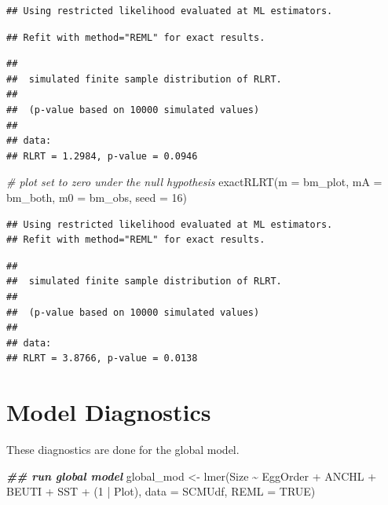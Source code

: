 \documentclass[
]{article}
\newenvironment{Shaded}{\begin{snugshade}}{\end{snugshade}}
\newcommand{\AttributeTok}[1]{\textcolor[rgb]{0.77,0.63,0.00}{#1}}
\newcommand{\CommentTok}[1]{\textcolor[rgb]{0.56,0.35,0.01}{\textit{#1}}}
\newcommand{\ConstantTok}[1]{\textcolor[rgb]{0.00,0.00,0.00}{#1}}
\newcommand{\DecValTok}[1]{\textcolor[rgb]{0.00,0.00,0.81}{#1}}
\newcommand{\DocumentationTok}[1]{\textcolor[rgb]{0.56,0.35,0.01}{\textbf{\textit{#1}}}}
\newcommand{\FunctionTok}[1]{\textcolor[rgb]{0.00,0.00,0.00}{#1}}
\newcommand{\NormalTok}[1]{#1}
\newcommand{\OtherTok}[1]{\textcolor[rgb]{0.56,0.35,0.01}{#1}}
\newcommand{\SpecialCharTok}[1]{\textcolor[rgb]{0.00,0.00,0.00}{#1}}
\begin{document}
\begin{verbatim}
## Using restricted likelihood evaluated at ML estimators.
\end{verbatim}

\begin{verbatim}
## Refit with method="REML" for exact results.
\end{verbatim}

\begin{verbatim}
## 
##  simulated finite sample distribution of RLRT.
##  
##  (p-value based on 10000 simulated values)
## 
## data:  
## RLRT = 1.2984, p-value = 0.0946
\end{verbatim}

\begin{Shaded}
\begin{Highlighting}[]
\CommentTok{\# plot set to zero under the null hypothesis }
\FunctionTok{exactRLRT}\NormalTok{(}\AttributeTok{m =}\NormalTok{ bm\_plot, }\AttributeTok{mA =}\NormalTok{ bm\_both, }\AttributeTok{m0 =}\NormalTok{ bm\_obs, }\AttributeTok{seed =} \DecValTok{16}\NormalTok{)}
\end{Highlighting}
\end{Shaded}

\begin{verbatim}
## Using restricted likelihood evaluated at ML estimators.
## Refit with method="REML" for exact results.
\end{verbatim}

\begin{verbatim}
## 
##  simulated finite sample distribution of RLRT.
##  
##  (p-value based on 10000 simulated values)
## 
## data:  
## RLRT = 3.8766, p-value = 0.0138
\end{verbatim}

\hypertarget{model-diagnostics}{%
\section{Model Diagnostics}\label{model-diagnostics}}

These diagnostics are done for the global model.

\begin{Shaded}
\begin{Highlighting}[]
\DocumentationTok{\#\# run global model}
\NormalTok{global\_mod }\OtherTok{\textless{}{-}} \FunctionTok{lmer}\NormalTok{(Size }\SpecialCharTok{\textasciitilde{}}\NormalTok{ EggOrder }\SpecialCharTok{+}\NormalTok{ ANCHL }\SpecialCharTok{+}\NormalTok{ BEUTI }\SpecialCharTok{+}\NormalTok{ SST }\SpecialCharTok{+}\NormalTok{ (}\DecValTok{1} \SpecialCharTok{|}\NormalTok{ Plot), }\AttributeTok{data =}\NormalTok{ SCMUdf, }\AttributeTok{REML =} \ConstantTok{TRUE}\NormalTok{)}
\end{Highlighting}
\end{Shaded}
\end{document}
